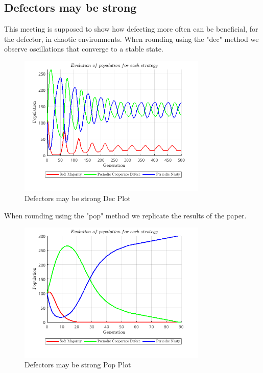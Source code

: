\subsection{Defectors may be strong}
This meeting is supposed to show how defecting more often can be beneficial, for the defector, in chaotic environments. When rounding using the "dec" method we observe oscillations that converge to a stable state. 
\begin{figure}[H]
    \centering
    \includegraphics[width=0.8\textwidth]{media/meetings/defectors_may_be_strong_dec.png}
    \caption{Defectors may be strong Dec Plot}
\end{figure}
When rounding using the "pop" method we replicate the results of the paper.
\begin{figure}[H]
    \centering
    \includegraphics[width=0.8\textwidth]{media/meetings/defectors_may_be_strong_pop.png}
    \caption{Defectors may be strong Pop Plot}
\end{figure}

